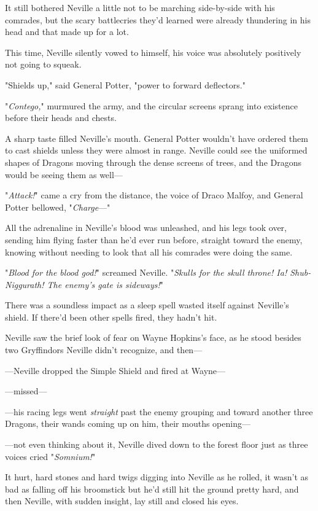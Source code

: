 It still bothered Neville a little not to be marching side-by-side with his
comrades, but the scary battlecries they'd learned were already thundering in
his head and that made up for a lot.

This time, Neville silently vowed to himself, his voice was absolutely
positively not going to squeak.

"Shields up," said General Potter, "power to forward deflectors."

"\emph{Contego,}" murmured the army, and the circular screens sprang into
existence before their heads and chests.

A sharp taste filled Neville's mouth. General Potter wouldn't have ordered them
to cast shields unless they were almost in range. Neville could see the
uniformed shapes of Dragons moving through the dense screens of trees, and the
Dragons would be seeing them as well\mbox{---}

"\emph{Attack!}" came a cry from the distance, the voice of Draco Malfoy, and
General Potter bellowed, "\emph{Charge}\mbox{---}"

All the adrenaline in Neville's blood was unleashed, and his legs took over,
sending him flying faster than he'd ever run before, straight toward the enemy,
knowing without needing to look that all his comrades were doing the same.

"\emph{Blood for the blood god!}" screamed Neville. "\emph{Skulls for the skull
throne! Ia! Shub-Niggurath! The enemy's gate is sideways!}"

There was a soundless impact as a sleep spell wasted itself against Neville's
shield. If there'd been other spells fired, they hadn't hit.

Neville saw the brief look of fear on Wayne Hopkins's face, as he stood besides
two Gryffindors Neville didn't recognize, and then\mbox{---}

---Neville dropped the Simple Shield and fired at Wayne\mbox{---}

---missed\mbox{---}

---his racing legs went \emph{straight} past the enemy grouping and toward
another three Dragons, their wands coming up on him, their mouths opening\mbox{---}

---not even thinking about it, Neville dived down to the forest floor just as
three voices cried "\emph{Somnium!}"

It hurt, hard stones and hard twigs digging into Neville as he rolled, it
wasn't as bad as falling off his broomstick but he'd still hit the ground
pretty hard, and then Neville, with sudden insight, lay still and closed his
eyes.

